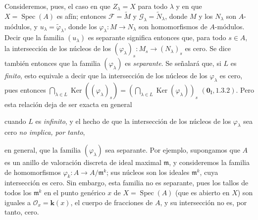 \begin{env}[11.9.4]
\label{IV.11.9.4}
Consideremos, pues, el caso en que $Z_\lambda=X$ para todo $\lambda$ y en que $X=\operatorname{Spec}(A)$ es afín; entonces $\mathcal F=\widetilde M$ y $\mathcal G_\lambda=\widetilde N_\lambda$, donde $M$ y los $N_\lambda$ son $A$-módulos, y $u_\lambda=\widetilde\varphi_\lambda$, donde los $\varphi_\lambda:M\to N_\lambda$ son homomorfismos de $A$-módulos.
Decir que la familia $(u_\lambda)$ es separante significa entonces que, para todo $s\in A$, la intersección de los núcleos de los $(\varphi_\lambda)_s:M_s\to(N_\lambda)_s$ es cero.
Se dice también entonces que la familia $(\varphi_\lambda)$ es \emph{separante}.
Se señalará que, si $L$ es \emph{finito}, esto equivale a decir que la intersección de los núcleos de los $\varphi_\lambda$ es cero, pues entonces
$\bigcap_{\lambda\in L}\operatorname{Ker}((\varphi_\lambda)_s)
=(\bigcap_{\lambda\in L}\operatorname{Ker}(\varphi_\lambda))_s$
$(\mathbf 0_{\mathrm I},1.3.2)$.
Pero esta relación deja de ser exacta en general

cuando $L$ es \emph{infinito}, y el hecho de que la intersección de los núcleos de los $\varphi_\lambda$ sea cero \emph{no implica, por tanto},



en general, que la familia $(\varphi_\lambda)$ sea separante.
Por ejemplo, supongamos que $A$ es un anillo de valoración discreta de ideal maximal $\mathfrak m$, y consideremos la familia de homomorfismos $\varphi_k:A\to A/\mathfrak m^k$; sus núcleos son los ideales $\mathfrak m^k$, cuya intersección es cero. Sin embargo, esta familia no es separante, pues los tallos de todos los $\mathfrak m^k$ en el punto genérico $x$ de $X=\operatorname{Spec}(A)$ (que es abierto en $X$) son iguales a $\mathcal O_x=\boldsymbol{k}(x)$, el cuerpo de fracciones de $A$, y su intersección no es, por tanto, cero.
\end{env}

